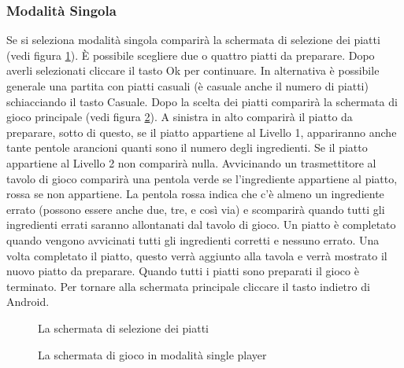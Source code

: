 \subsubsection{Modalità Singola}

Se si seleziona modalità singola comparirà la schermata di selezione dei piatti (vedi figura \ref{fig:screen1}). È possibile scegliere due o quattro piatti da preparare. Dopo averli selezionati cliccare il tasto Ok per continuare. In alternativa è possibile generale una partita con piatti casuali (è casuale anche il numero di piatti) schiacciando il tasto Casuale.
Dopo la scelta dei piatti comparirà la schermata di gioco principale (vedi figura \ref{fig:screen2}). A sinistra in alto comparirà il piatto da preparare, sotto di questo, se il piatto appartiene al Livello 1, appariranno anche tante pentole arancioni quanti sono il numero degli ingredienti. Se il piatto appartiene al Livello 2 non comparirà nulla. 
Avvicinando un trasmettitore al tavolo di gioco comparirà una pentola verde se l’ingrediente appartiene al piatto, rossa se non appartiene. La pentola rossa indica che c’è almeno un ingrediente errato (possono essere anche due, tre, e così via) e scomparirà quando tutti gli ingredienti errati saranno allontanati dal tavolo di gioco. Un piatto è completato quando vengono avvicinati tutti gli ingredienti corretti e nessuno errato.
Una volta completato il piatto, questo verrà aggiunto alla tavola e verrà mostrato il nuovo piatto da preparare. Quando tutti i piatti sono preparati il gioco è terminato. Per tornare alla schermata principale cliccare il tasto indietro di Android.

\begin{figure}[h!]
\label{fig:screen1}
\centering
{}
\caption{La schermata di selezione dei piatti}
\end{figure}

\begin{figure}[h!]
\label{fig:screen2}
\centering
{}
\caption{La schermata di gioco in modalità single player}
\end{figure}


